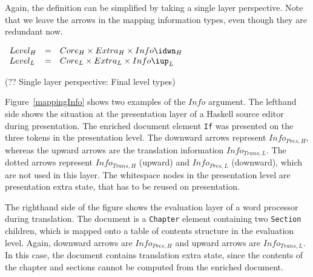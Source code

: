 Again, the definition can be simplified by taking a single layer perspective. Note that we leave the arrows in the  mapping information types, even though they are redundant now.

\begin{small}\(\begin{array}{lcll} \label{inv:extraStateSL}
Level_{H} & = & Core_{H} \times Extra_{H} \times Info\idwn_{H}\\
Level_{L} & = & Core_{L} \times Extra_{L} \times Info\iup_{L}\\
\end{array}\)\end{small}
\begin{center}(?? Single layer perspective: Final level types)\end{center}\vspace{1em}

\bc
Figure~\ref{mappingInfo} shows two examples of the $Info$ argument. The lefthand side shows the situation at the presentation layer of a Haskell source editor during presentation.  The enriched document element \verb|If|  was presented on the three tokens in the presentation level. The downward arrows represent $Info_{Pres,H}$, whereas the upward arrows are the translation information $Info_{Trans, L}$. The dotted arrows represent $Info_{Trans,H}$ (upward) and $Info_{Pres,L}$ (downward), which are not used in this layer. The whitespace nodes in the presentation level are presentation extra state, that has to be reused on presentation. 

The righthand side of the figure shows the evaluation layer of a word processor during translation. The document is a \verb|Chapter| element containing two \verb|Section| children, which is mapped onto a table of contents structure in the evaluation level. Again, downward arrows are $Info_{Pres,H}$ and upward arrows are $Info_{Trans,L}$.  In this case, the document contains translation extra state, since the contents of the chapter and sections cannot be computed from the enriched document.  

